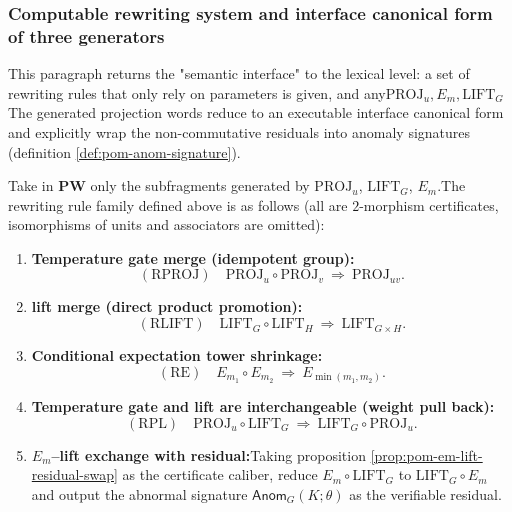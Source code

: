 \subsubsection{Computable rewriting system and interface canonical form of three generators}\label{subsec:pom-three-gen-rewrite-normal}
This paragraph returns the "semantic interface" to the lexical level: a set of rewriting rules that only rely on parameters is given, and any\(\mathrm{PROJ}_u,E_m,\mathrm{LIFT}_G\)
The generated projection words reduce to an executable interface canonical form and explicitly wrap the non-commutative residuals into anomaly signatures (definition \ref{def:pom-anom-signature}).
\begin{definition}\label{def:pom-three-gen-rewrite-rules}Take in $\mathbf{PW}$ only the subfragments generated by \(\mathrm{PROJ}_u\), \(\mathrm{LIFT}_G\), \(E_m\).The rewriting rule family defined above is as follows (all are $2$-morphism certificates, isomorphisms of units and associators are omitted):\begin{enumerate}
\item \textbf{Temperature gate merge (idempotent group):}  $$
  (\mathrm{RPROJ})\quad
  \mathrm{PROJ}_u\circ \mathrm{PROJ}_v\ \Rightarrow\ \mathrm{PROJ}_{uv}.
  $$
\item \textbf{lift merge (direct product promotion):}  $$
  (\mathrm{RLIFT})\quad
  \mathrm{LIFT}_G\circ \mathrm{LIFT}_H\ \Rightarrow\ \mathrm{LIFT}_{G\times H}.
  $$
\item \textbf{Conditional expectation tower shrinkage:}  $$
  (\mathrm{RE})\quad
  E_{m_1}\circ E_{m_2}\ \Rightarrow\ E_{\min(m_1,m_2)}.
  $$
\item \textbf{Temperature gate and lift are interchangeable (weight pull back):}  $$
  (\mathrm{RPL})\quad
  \mathrm{PROJ}_u\circ \mathrm{LIFT}_G\ \Rightarrow\ \mathrm{LIFT}_G\circ \mathrm{PROJ}_u.
  $$
\item \textbf{\(E_m\)--lift exchange with residual:}Taking proposition \ref{prop:pom-em-lift-residual-swap} as the certificate caliber, reduce \(E_m\circ\mathrm{LIFT}_G\) to \(\mathrm{LIFT}_G\circ E_m\) and output the abnormal signature \(\mathsf{Anom}_G(K;\theta)\) as the verifiable residual.\end{enumerate}
\end{definition}

